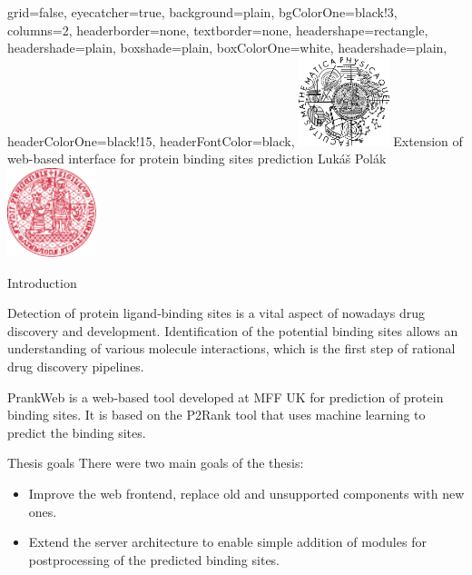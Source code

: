 \documentclass[portrait,a0paper,fontscale=0.25]{baposter}
\begin{document}
\color{black!80} %
\begin{poster}{grid=false,
	eyecatcher=true,
	background=plain,
	bgColorOne=black!3, %
	columns=2,
	headerborder=none,
	textborder=none,
	headershape=rectangle,
	headershade=plain,
	boxshade=plain,
	boxColorOne=white,
	headershade=plain,
	headerColorOne=black!15, %
	headerFontColor=black,
	}%
	{\includegraphics[height=7em]{logos/mff-black.pdf}}
	{Extension of web-based interface for protein binding sites prediction}
	{\vspace{1ex} Lukáš Polák}
	{\includegraphics[height=7em]{logos/uk-red.pdf}}


%
%

\begin{posterbox}[column=0,name=intro]{Introduction}

Detection of protein ligand-binding sites is a vital aspect of nowadays drug
discovery and development. Identification of the potential binding sites allows an
understanding of various molecule interactions, which is the first step of rational
drug discovery pipelines.

PrankWeb is a web-based tool developed at MFF UK for prediction of protein binding sites. It is based
on the P2Rank tool that uses machine learning to predict the binding sites.


\end{posterbox}

\begin{posterbox}[column=0, name=goals, below=intro, headerColorOne=cyan!60, boxColorOne=cyan!20]{Thesis goals}
There were two main goals of the thesis:
\begin{itemize}
\item Improve the web frontend, replace old and unsupported components with new ones.
\item Extend the server architecture to enable simple addition of modules for postprocessing of the predicted
binding sites.
\end{itemize}
\end{posterbox}


\end{poster}
\end{document}
